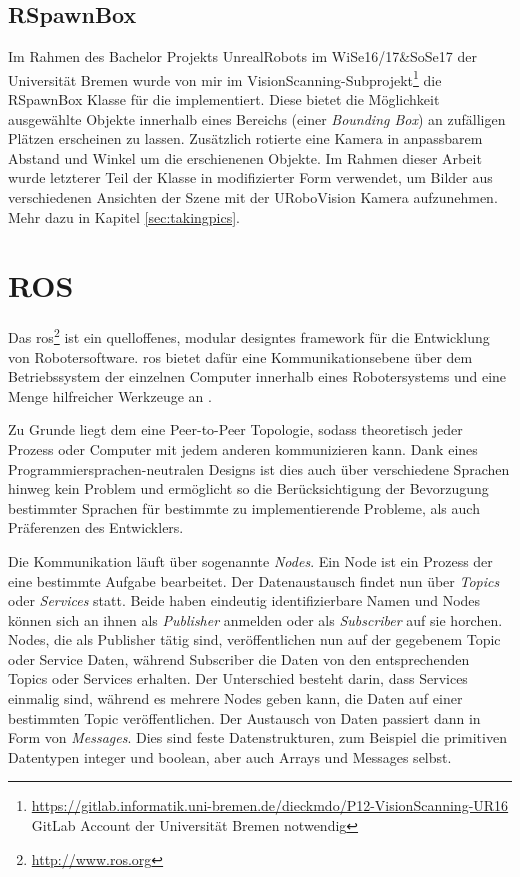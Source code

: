 \subsection{RSpawnBox}
\label{sec:rspawnbox}

Im Rahmen des Bachelor Projekts UnrealRobots im WiSe16/17\&SoSe17 der Universität Bremen wurde von mir im VisionScanning-Subprojekt\footnote{\url{https://gitlab.informatik.uni-bremen.de/dieckmdo/P12-VisionScanning-UR16} GitLab Account der Universität Bremen notwendig} die RSpawnBox Klasse für die \unreal implementiert. Diese bietet die Möglichkeit ausgewählte Objekte innerhalb eines Bereichs (einer \textit{Bounding Box}) an zufälligen Plätzen erscheinen zu lassen. Zusätzlich rotierte eine Kamera in anpassbarem Abstand und Winkel um die erschienenen Objekte. Im Rahmen dieser Arbeit wurde letzterer Teil der Klasse in modifizierter Form verwendet, um Bilder aus verschiedenen Ansichten der Szene mit der URoboVision Kamera aufzunehmen. Mehr dazu in Kapitel \ref{sec:takingpics}.         

\section{ROS}
\label{sec:ros}
Das \gls{ros}\footnote{\url{http://www.ros.org}} ist ein quelloffenes, modular designtes \gls{framework} für die Entwicklung von Robotersoftware. \gls{ros} bietet dafür eine Kommunikationsebene über dem Betriebssystem der einzelnen Computer innerhalb eines Robotersystems und eine Menge hilfreicher Werkzeuge an \cite{ros}.\par 

Zu Grunde liegt dem eine Peer-to-Peer Topologie, sodass theoretisch jeder Prozess oder Computer mit jedem anderen kommunizieren kann. Dank eines Programmiersprachen-neutralen Designs ist dies auch über verschiedene Sprachen hinweg kein Problem und ermöglicht so die Berücksichtigung der Bevorzugung bestimmter Sprachen für bestimmte zu implementierende Probleme, als auch Präferenzen des Entwicklers.\par

Die Kommunikation läuft über sogenannte \textit{Nodes}. Ein Node ist ein Prozess der eine bestimmte Aufgabe bearbeitet. Der Datenaustausch findet nun über \textit{Topics} oder \textit{Services} statt. Beide haben eindeutig identifizierbare Namen und Nodes können sich an ihnen als \textit{Publisher} anmelden oder als \textit{Subscriber} auf sie horchen. Nodes, die als Publisher tätig sind, veröffentlichen nun auf der gegebenem Topic oder Service Daten, während Subscriber die Daten von den entsprechenden Topics oder Services erhalten. Der Unterschied besteht darin, dass Services einmalig sind, während es mehrere Nodes geben kann, die Daten auf einer bestimmten Topic veröffentlichen. Der Austausch von Daten passiert dann in Form von \textit{Messages}. Dies sind feste Datenstrukturen, zum Beispiel die primitiven Datentypen integer und boolean, aber auch Arrays und Messages selbst. \par

